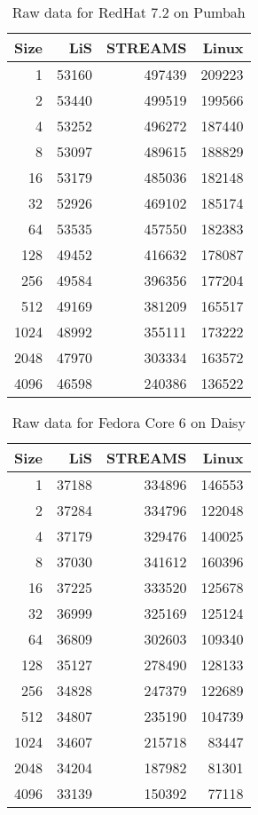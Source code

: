 \documentclass[letterpaper,final,notitlepage,twocolumn,10pt,twoside]{article}
\begin{document}
\begin{appendix}
\begin{table}[hp]
\footnotesize
\setlength{\tabcolsep}{0.3em}
\setlength{\arraycolsep}{0.3em}
\begin{center}
\begin{tabular}{rrrr}\\
\hline
Size & LiS & STREAMS & Linux\\
\hline
\hline
1 & 53160 & 497439 & 209223\\
2 & 53440 & 499519 & 199566\\
4 & 53252 & 496272 & 187440\\
8 & 53097 & 489615 & 188829\\
16 & 53179 & 485036 & 182148\\
32 & 52926 & 469102 & 185174\\
64 & 53535 & 457550 & 182383\\
128 & 49452 & 416632 & 178087\\
256 & 49584 & 396356 & 177204\\
512 & 49169 & 381209 & 165517\\
1024 & 48992 & 355111 & 173222\\
2048 & 47970 & 303334 & 163572\\
4096 & 46598 & 240386 & 136522\\
\hline
\end{tabular}
\end{center}
\caption{Raw data for RedHat 7.2 on Pumbah}
\label{table:rh7data}
\normalsize
\end{table}

\begin{table}[hp]
\footnotesize
\setlength{\tabcolsep}{0.3em}
\setlength{\arraycolsep}{0.3em}
\begin{center}
\begin{tabular}{rrrr}\\
\hline
Size & LiS & STREAMS & Linux\\
\hline
\hline
1 & 37188 & 334896 & 146553\\
2 & 37284 & 334796 & 122048\\
4 & 37179 & 329476 & 140025\\
8 & 37030 & 341612 & 160396\\
16 & 37225 & 333520 & 125678\\
32 & 36999 & 325169 & 125124\\
64 & 36809 & 302603 & 109340\\
128 & 35127 & 278490 & 128133\\
256 & 34828 & 247379 & 122689\\
512 & 34807 & 235190 & 104739\\
1024 & 34607 & 215718 & 83447\\
2048 & 34204 & 187982 & 81301\\
4096 & 33139 & 150392 & 77118\\
\hline
\end{tabular}
\end{center}
\caption{Raw data for Fedora Core 6 on Daisy}
\label{table:smpdata}
\normalsize
\end{table}


\end{appendix}
\end{document}
